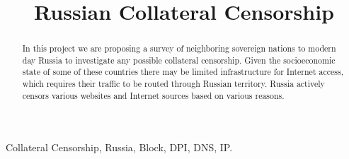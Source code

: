 \documentclass[conference]{IEEEtran}
\begin{document}
%
\title{Russian Collateral Censorship}


\author{
\and
{}
\and
{}
}

\maketitle


\begin{abstract}
In this project we are proposing a survey of neighboring sovereign nations to modern day Russia to investigate any possible collateral censorship.
Given the socioeconomic state of some of these countries there may be limited infrastructure for Internet access, which requires their traffic to be routed through Russian territory.
Russia actively censors various websites and Internet sources based on various reasons.

\end{abstract}

\begin{IEEEkeywords}
Collateral Censorship, Russia, Block, DPI, DNS, IP.
\end{IEEEkeywords}

\IEEEpeerreviewmaketitle
\end{document}
